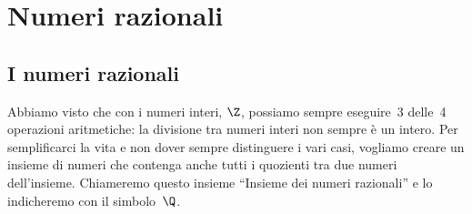 


% 


\renewcommand{\cancelto}[3][]
  {\tikz[baseline=(N.base)]{
    \node[main node](N){$#2$};
    \node[label node,#1, anchor=south west] at (N.north east){$#3$};
    \draw[strike out,-latex,#1]  (N.south west) -- (N.north east);
  }
}

\newcommand{\bcancelto}[3][]
  {\tikz[baseline=(N.base)]{
    \node[main node](N){$#2$};
    \node[label node,#1, anchor=north west] at (N.south east){$#3$};
    \draw[strike out,-latex,#1]  (N.north west) -- (N.south east);
  }
}


\chapter{Numeri razionali}

\section{I numeri razionali}
\label{sec:razionali_razionali}

% 

Abbiamo visto che con i numeri interi, \(\Z\), possiamo sempre eseguire~3 
delle~4 operazioni aritmetiche: la divisione tra numeri interi non sempre è 
un intero. Per semplificarci la vita e non dover sempre distinguere i vari 
casi, vogliamo creare un insieme di numeri che contenga anche tutti i 
quozienti tra due numeri dell'insieme. 
Chiameremo questo insieme ``Insieme dei numeri razionali'' e lo 
indicheremo con il simbolo~\(\Q\).

